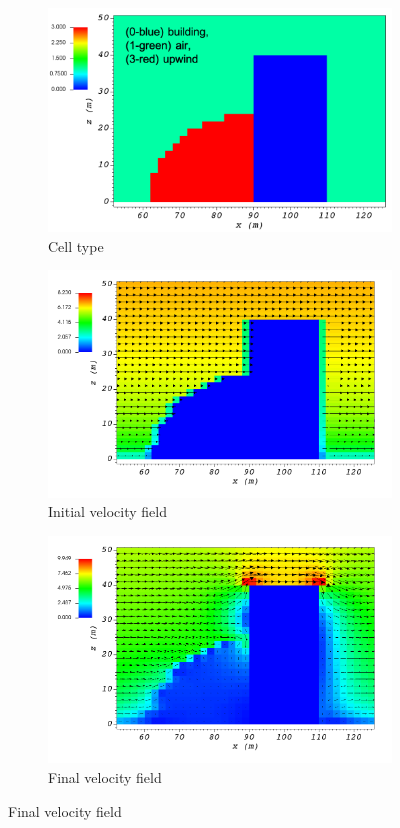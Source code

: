\documentclass[14pt,landscape]{report}
\begin{document}
\begin{figure}[p]
    \centering
    \begin{subfigure}[t]{0.45\textwidth}
    \centering
    \includegraphics[width=10.3cm,keepaspectratio]{Images/upwind_y_100_1_init_icell.png}
    \caption{Cell type}
    \end{subfigure}
    \begin{subfigure}[t]{0.45\textwidth}
    \centering
    \includegraphics[width=11.0cm,keepaspectratio]{Images/upwind_y_100_1_init_vel.png}
    \caption{Initial velocity field}
    \end{subfigure}
    \begin{subfigure}[t]{0.45\textwidth}
    \centering
    \includegraphics[width=11.0cm,keepaspectratio]{Images/upwind_y_100_1_final.png}
    \caption{Final velocity field}
    \end{subfigure}
\end{figure}
\end{document}
